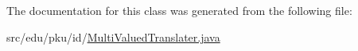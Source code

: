 The documentation for this class was generated from the following file:\begin{DoxyCompactItemize}
\item 
src/edu/pku/id/\hyperlink{_multi_valued_translater_8java}{MultiValuedTranslater.java}\end{DoxyCompactItemize}
